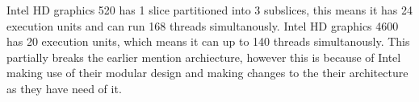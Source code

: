 Intel HD graphics 520 has 1 slice partitioned into 3 subslices, this means it has 24 execution units and can run 168 threads simultanously.
Intel HD graphics 4600 has 20 execution units, which means it can up to 140 threads simultanously. 
This partially breaks the earlier mention archiecture, however this is because of Intel making use of their modular design and making changes to the their architecture as they have need of it.
